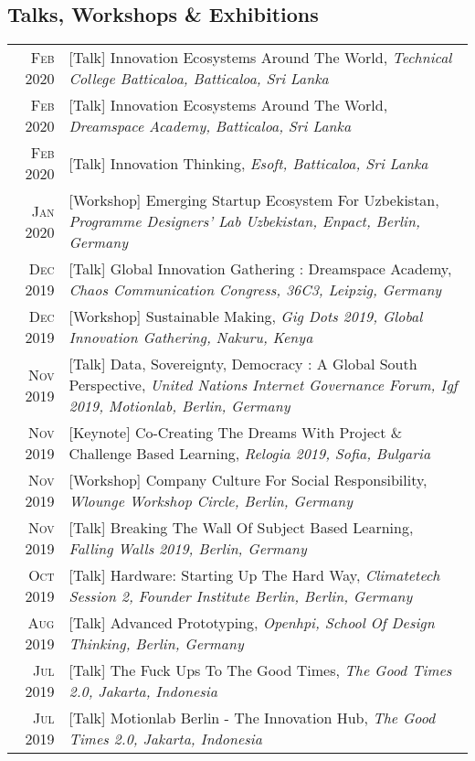 \subsection{Talks, Workshops \& Exhibitions}
\begin{longtable}
	{r|p{13cm}}
	\textsc{Feb 2020} & [Talk] Innovation Ecosystems Around The World, \emph{Technical College Batticaloa, Batticaloa, Sri Lanka}\\
	\textsc{Feb 2020} & [Talk] Innovation Ecosystems Around The World, \emph{Dreamspace Academy, Batticaloa, Sri Lanka}\\
	\textsc{Feb 2020} & [Talk] Innovation Thinking, \emph{Esoft, Batticaloa, Sri Lanka}\\
	\textsc{Jan 2020} & [Workshop] Emerging Startup Ecosystem For Uzbekistan, \emph{Programme Designers’ Lab Uzbekistan, Enpact, Berlin, Germany}\\
	\textsc{Dec 2019} & [Talk] Global Innovation Gathering : Dreamspace Academy, \emph{Chaos Communication Congress, 36C3, Leipzig, Germany}\\
	\textsc{Dec 2019} & [Workshop] Sustainable Making, \emph{Gig Dots 2019, Global Innovation Gathering, Nakuru, Kenya}\\
	\textsc{Nov 2019} & [Talk] Data, Sovereignty, Democracy : A Global South Perspective, \emph{United Nations Internet Governance Forum, Igf 2019, Motionlab, Berlin, Germany}\\
	\textsc{Nov 2019} & [Keynote] Co-Creating The Dreams With Project \& Challenge Based Learning, \emph{Relogia 2019, Sofia, Bulgaria}\\
	\textsc{Nov 2019} & [Workshop] Company Culture For Social Responsibility, \emph{Wlounge Workshop Circle, Berlin, Germany}\\
	\textsc{Nov 2019} & [Talk] Breaking The Wall Of Subject Based Learning, \emph{Falling Walls 2019, Berlin, Germany}\\
	\textsc{Oct 2019} & [Talk] Hardware: Starting Up The Hard Way, \emph{Climatetech Session 2, Founder Institute Berlin, Berlin, Germany}\\
	\textsc{Aug 2019} & [Talk] Advanced Prototyping, \emph{Openhpi, School Of Design Thinking, Berlin, Germany}\\
	\textsc{Jul 2019} & [Talk] The Fuck Ups To The Good Times, \emph{The Good Times 2.0, Jakarta, Indonesia}\\
	\textsc{Jul 2019} & [Talk] Motionlab Berlin - The Innovation Hub, \emph{The Good Times 2.0, Jakarta, Indonesia}\\

\end{longtable}
